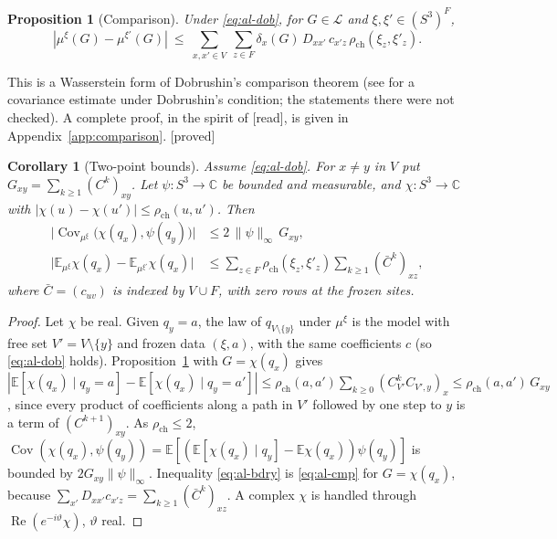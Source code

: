 \documentclass[11pt,a4paper]{article}
\theoremstyle{remark}
\theoremstyle{definition}
\theoremstyle{plain}
\newtheorem{alprop}[althm]{Proposition}
\newtheorem{alcor}[althm]{Corollary}
\theoremstyle{remark}
\newcommand{\E}{\mathbb{E}}
\newcommand{\st}[1]{\textsf{[#1]}}
\newcommand{\rch}{\rho_{\mathrm{ch}}}
\begin{document}
\begin{alprop}[Comparison]\label{prop:al-comparison}
Under \eqref{eq:al-dob}, for $G\in\mathcal L$ and $\xi,\xi'\in(S^3)^F$,
\begin{equation}\label{eq:al-cmp}
|\mu^\xi(G)-\mu^{\xi'}(G)|\ \le\ \sum_{x,x'\in V}\ \sum_{z\in F}\delta_x(G)\,D_{xx'}\,c_{x'z}\,\rch(\xi_z,\xi'_z).
\end{equation}
\end{alprop}
\noindent This is a Wasserstein form of Dobrushin's comparison theorem (see \cite{Fol82} for a covariance estimate under Dobrushin's condition; the statements there were not checked). A complete proof, in the spirit of \cite[Prop.~2.5]{Wu06} \st{read}, is given in Appendix~\ref{app:comparison}. \st{proved}

\begin{alcor}[Two-point bounds]\label{cor:al-twopoint}
Assume \eqref{eq:al-dob}. For $x\ne y$ in $V$ put $G_{xy}=\sum_{k\ge1}(C^k)_{xy}$. Let $\psi:S^3\to\mathbb C$ be bounded and measurable, and $\chi:S^3\to\mathbb C$ with $|\chi(u)-\chi(u')|\le\rch(u,u')$. Then
\begin{align}
\big|\operatorname{Cov}_{\mu^\xi}\big(\chi(q_x),\psi(q_y)\big)\big|&\le2\,\|\psi\|_\infty\,G_{xy},\label{eq:al-cov}\\
\big|\E_{\mu^\xi}\chi(q_x)-\E_{\mu^{\xi'}}\chi(q_x)\big|&\le\sum_{z\in F}\rch(\xi_z,\xi'_z)\sum_{k\ge1}(\bar C^k)_{xz},\label{eq:al-bdry}
\end{align}
where $\bar C=(c_{uv})$ is indexed by $V\cup F$, with zero rows at the frozen sites.
\end{alcor}
\begin{proof}
Let $\chi$ be real. Given $q_y=a$, the law of $q_{V\setminus\{y\}}$ under $\mu^\xi$ is the model with free set $V'=V\setminus\{y\}$ and frozen data $(\xi,a)$, with the same coefficients $c$ (so \eqref{eq:al-dob} holds). Proposition~\ref{prop:al-comparison} with $G=\chi(q_x)$ gives $|\E[\chi(q_x)\mid q_y=a]-\E[\chi(q_x)\mid q_y=a']|\le\rch(a,a')\sum_{k\ge0}(C_{V'}^kC_{V',y})_x\le\rch(a,a')\,G_{xy}$, since every product of coefficients along a path in $V'$ followed by one step to $y$ is a term of $(C^{k+1})_{xy}$. As $\rch\le2$, $\operatorname{Cov}(\chi(q_x),\psi(q_y))=\E[(\E[\chi(q_x)\mid q_y]-\E\chi(q_x))\psi(q_y)]$ is bounded by $2G_{xy}\|\psi\|_\infty$. Inequality \eqref{eq:al-bdry} is \eqref{eq:al-cmp} for $G=\chi(q_x)$, because $\sum_{x'}D_{xx'}c_{x'z}=\sum_{k\ge1}(\bar C^k)_{xz}$. A complex $\chi$ is handled through $\operatorname{Re}(e^{-i\vartheta}\chi)$, $\vartheta$ real.
\end{proof}
\end{document}
